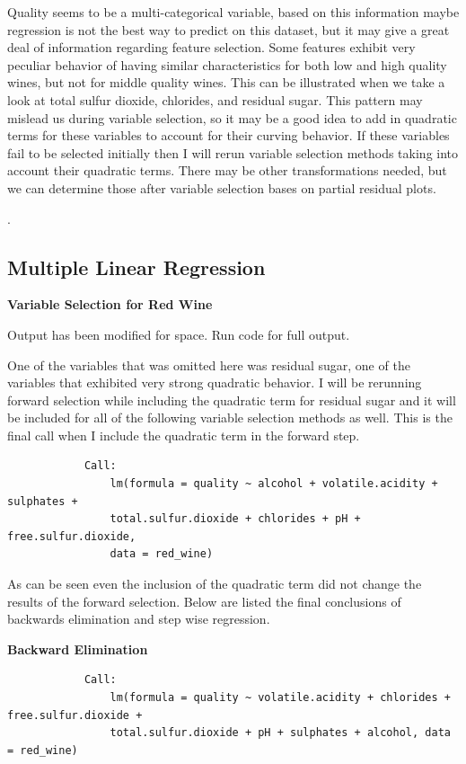 \documentclass{article}
\begin{document}
	Quality seems to be a multi-categorical variable, based on this information maybe regression is not the best
	way to predict on this dataset, but it may give a great deal of information regarding feature selection. Some
	features exhibit very peculiar behavior of having similar characteristics for both low and high quality wines, but
	not for middle quality wines. This can be illustrated when we take a look at total sulfur dioxide, chlorides, and 
	residual sugar. This pattern may mislead us during variable selection, so it may be a good idea to add in 
	quadratic terms for these variables to account for their curving behavior. If these variables fail to be selected 
	initially then I will rerun variable selection methods taking into account their quadratic terms. There may 
	be other transformations needed, but we can determine those after variable selection bases on partial residual 
	plots. 
	
	\newpage
	. 

	\subsection{Multiple Linear Regression}
	

	\textbf{Variable Selection for Red Wine} 
	
	
		Output has been modified for space. Run code for full output. 
	

	One of the variables that was omitted here was residual sugar, one of the variables that exhibited very strong 
	quadratic behavior. I will be rerunning forward selection while including the quadratic term for residual sugar 
	and it will be included for all of the following variable selection methods as well. This is the final call when 
	I include the quadratic term in the forward step. 
	
	\begin{verbatim}
			Call:
				lm(formula = quality ~ alcohol + volatile.acidity + sulphates + 
				total.sulfur.dioxide + chlorides + pH + free.sulfur.dioxide, 
				data = red_wine)
	\end{verbatim}
	
	As can be seen even the inclusion of the quadratic term did not change the results of the forward selection. Below
	are listed the final conclusions of backwards elimination and step wise regression. 
	
	\textbf{Backward Elimination}
	\begin{verbatim}
			Call:
				lm(formula = quality ~ volatile.acidity + chlorides + free.sulfur.dioxide + 
				total.sulfur.dioxide + pH + sulphates + alcohol, data = red_wine)
	\end{verbatim}
	
\end{document}

